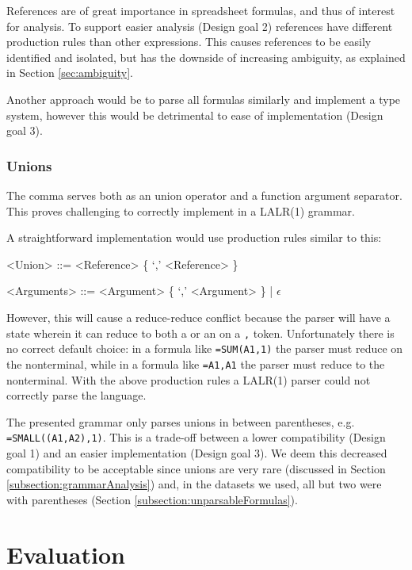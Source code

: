 \documentclass[times]{smrauth}
\begin{document}
References are of great importance in spreadsheet formulas, and thus of interest for analysis.
To support easier analysis (Design goal 2) references have different production rules than other expressions.
This causes references to be easily identified and isolated, but has the downside of increasing ambiguity, as explained in Section \ref{sec:ambiguity}. 

Another approach would be to parse all formulas similarly and implement a type system, however this would be detrimental to ease of implementation (Design goal 3).

\subsubsection{\textbf{Unions}}
\label{subsec:desing:unions}

The comma serves both as an union operator and a function argument separator.
This proves challenging to correctly implement in a LALR(1) grammar.

A straightforward implementation would use production rules similar to this:
\begin{grammar}
	<Union> ::= <Reference> \{ `,' <Reference> \}

	<Arguments> ::= <Argument> \{ `,' <Argument> \} | $\epsilon$
\end{grammar}

However, this will cause a reduce-reduce conflict because the parser will have a state wherein it can reduce to both a  or an  on a \texttt{,} token.
Unfortunately there is no correct default choice: in a formula like \texttt{=SUM(A1,1)} the parser must reduce on the  nonterminal, while in a formula like \texttt{=A1,A1} the parser must reduce to the  nonterminal.
With the above production rules a LALR(1) parser could not correctly parse the language.

The presented grammar only parses unions in between parentheses, e.g. \texttt{=SMALL((A1,A2),1)}.
This is a trade-off between a lower compatibility (Design goal 1) and an easier implementation (Design goal 3).
We deem this decreased compatibility to be acceptable since unions are very rare (discussed in Section \ref{subsection:grammarAnalysis}) and, in the datasets we used, all but two were with parentheses (Section \ref{subsection:unparsableFormulas}).

\section{Evaluation}
\label{sec:evaluation}
\end{document}
